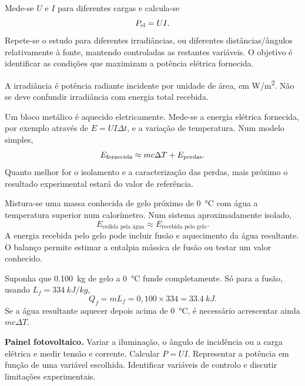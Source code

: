 \documentclass[11pt,a4paper,oneside]{book}
\begin{document}
\begin{atividade}[title=AL 3.1 -- Radiação e potência elétrica de um painel fotovoltaico]
Mede-se $U$ e $I$ para diferentes cargas e calcula-se
\[
P_{\rm el}=UI.
\]
Repete-se o estudo para diferentes irradiâncias, ou diferentes distâncias/ângulos relativamente à fonte, mantendo controladas as restantes variáveis. O objetivo é identificar as condições que maximizam a potência elétrica fornecida.

A irradiância é potência radiante incidente por unidade de área, em \si{W/m^2}. Não se deve confundir irradiância com energia total recebida.
\end{atividade}

\begin{atividade}[title=AL 3.2 -- Capacidade térmica mássica de um material]
Um bloco metálico é aquecido eletricamente. Mede-se a energia elétrica fornecida, por exemplo através de $E=UI\Delta t$, e a variação de temperatura. Num modelo simples,
\[
E_{\rm fornecida}\approx mc\Delta T+E_{\rm perdas}.
\]
Quanto melhor for o isolamento e a caracterização das perdas, mais próximo o resultado experimental estará do valor de referência.
\end{atividade}

\begin{atividade}[title=AL 3.3 -- Balanço energético num sistema água-gelo]
Mistura-se uma massa conhecida de gelo próximo de \SI{0}{\celsius} com água a temperatura superior num calorímetro. Num sistema aproximadamente isolado,
\[
E_{\text{cedida pela água}}\approx E_{\text{recebida pelo gelo}}.
\]
A energia recebida pelo gelo pode incluir fusão e aquecimento da água resultante. O balanço permite estimar a entalpia mássica de fusão ou testar um valor conhecido.
\end{atividade}

\begin{exemplo}[title=Exemplo resolvido -- balanço água-gelo]
Suponha que \SI{0.100}{kg} de gelo a \SI{0}{\celsius} funde completamente. Só para a fusão, usando $L_f=\SI{334}{kJ/kg}$,
\[
Q_f=mL_f=0{,}100\times334=\SI{33.4}{kJ}.
\]
Se a água resultante aquecer depois acima de \SI{0}{\celsius}, é necessário acrescentar ainda $mc\Delta T$.
\end{exemplo}

\begin{atividade}[title=Extensão -- painel fotovoltaico]
\textbf{Painel fotovoltaico.} Variar a iluminação, o ângulo de incidência ou a carga elétrica e medir tensão e corrente. Calcular $P=UI$. Representar a potência em função de uma variável escolhida. Identificar variáveis de controlo e discutir limitações experimentais.
\end{atividade}
\end{document}
